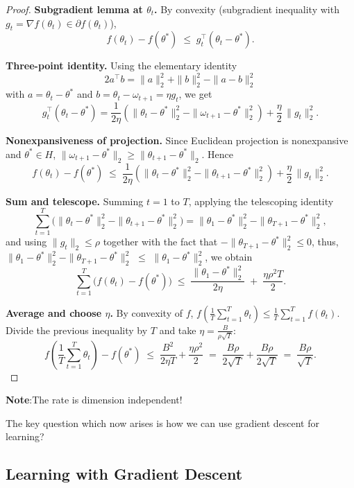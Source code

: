 \documentclass[11pt]{article}
\theoremstyle{plain}
\begin{document}
\begin{proof}
\textbf{Subgradient lemma at $\theta_t$.}
By convexity (subgradient inequality with $g_t=\nabla f(\theta_t)\in\partial f(\theta_t)$),
\[
f(\theta_t)-f(\theta^*) \;\le\; g_t^{\top}(\theta_t-\theta^*).
\]

\textbf{Three-point identity.}
Using the elementary identity
\[
2a^{\top}b=\|a\|_2^2+\|b\|_2^2-\|a-b\|_2^2
\]
with $a=\theta_t-\theta^*$ and $b=\theta_t-\omega_{t+1}=\eta g_t$, we get
\[
g_t^{\top}(\theta_t-\theta^*)
=\frac{1}{2\eta}\!\left(\|\theta_t-\theta^*\|_2^2-\|\omega_{t+1}-\theta^*\|_2^2\right)
+\frac{\eta}{2}\,\|g_t\|_2^2.
\]

\textbf{Nonexpansiveness of projection.}
Since Euclidean projection is nonexpansive and $\theta^*\in H$,
\(
\|\omega_{t+1}-\theta^*\|_2 \ge \|\theta_{t+1}-\theta^*\|_2.
\)
Hence
\[
f(\theta_t)-f(\theta^*) \;\le\;
\frac{1}{2\eta}\!\left(\|\theta_t-\theta^*\|_2^2-\|\theta_{t+1}-\theta^*\|_2^2\right)
+\frac{\eta}{2}\,\|g_t\|_2^2.
\]

\textbf{Sum and telescope.}
Summing $t=1$ to $T$, applying the telescoping identity 
\[
\sum_{t=1}^T \bigl(\|\theta_t-\theta^*\|_2^2 - \|\theta_{t+1}-\theta^*\|_2^2\bigr) 
= \|\theta_1-\theta^*\|_2^2 - \|\theta_{T+1}-\theta^*\|_2^2,
\] 
and using $\|g_t\|_2 \le \rho$ together with the fact that 
$-\|\theta_{T+1}-\theta^*\|_2^2 \le 0$, thus, $\|\theta_1-\theta^*\|_2^2 - \|\theta_{T+1}-\theta^*\|_2^2$ $\le$ $\|\theta_1-\theta^*\|_2^2$, we obtain
\[
\sum_{t=1}^T \bigl(f(\theta_t)-f(\theta^*)\bigr)
\;\le\; \frac{\|\theta_1-\theta^*\|_2^2}{2\eta} \;+\; \frac{\eta\rho^2 T}{2}.
\]


\textbf{Average and choose $\eta$.}
By convexity of $f$,
\(
f\!\left(\frac1T\sum_{t=1}^T\theta_t\right)\le \frac1T\sum_{t=1}^T f(\theta_t).
\)
Divide the previous inequality by $T$ and take
\(\eta=\frac{B}{\rho\sqrt{T}}\):
\[
f\!\left(\frac1T\sum_{t=1}^T\theta_t\right)-f(\theta^*)
\;\le\; \frac{B^2}{2\eta T}+\frac{\eta\rho^2}{2}
\;=\; \frac{B\rho}{2\sqrt{T}}+\frac{B\rho}{2\sqrt{T}}
\;=\; \frac{B\rho}{\sqrt{T}}.
\]
\end{proof}

\textbf{Note}:The rate is dimension independent!

The key question which now arises is how we can use gradient descent for learning?

\subsection{Learning with Gradient Descent}
\end{document}
